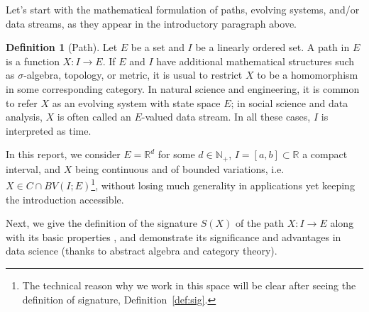 \documentclass[fleqn]{article}
\theoremstyle{definition}
\newtheorem{defn}[thm]{Definition}
\theoremstyle{remark}
\begin{document}
\par
Let's start with the mathematical formulation of paths, evolving systems, and/or data streams, as they appear in the introductory paragraph above.
\begin{defn}[Path]
Let $E$ be a set and $I$ be a linearly ordered set. A path in $E$ is a function $X:I\to E$. If $E$ and $I$ have additional mathematical structures such as $\sigma$-algebra, topology, or metric, it is usual to restrict $X$ to be a homomorphism in some corresponding category. In natural science and engineering, it is common to refer $X$ as an evolving system with state space $E$; in social science and data analysis, $X$ is often called an $E$-valued data stream. In all these cases, $I$ is interpreted as time.
\par
In this report, we consider $E=\mathbb{R}^d$ for some $d\in\mathbb{N}_+$, $I=[a,b]\subset \mathbb{R}$ a compact interval, and $X$ being continuous and of bounded variations, i.e. $X\in C\cap BV(I;E)$\footnote{The technical reason why we work in this space will be clear after seeing the definition of signature, Definition~\ref{def:sig}.}, without losing much generality in applications yet keeping the introduction accessible.
\end{defn}

\par
Next, we give the definition of the signature $S(X)$ of the path $X:I\to E$ along with its basic properties , and demonstrate its significance and advantages in data science (thanks to abstract algebra and category theory).


\end{document}
